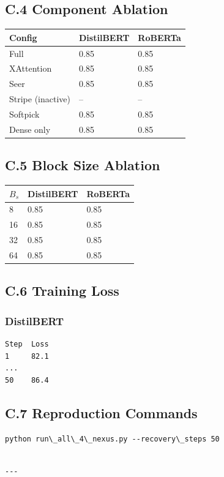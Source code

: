 \subsection{C.4 Component Ablation}

\begin{table}[H]
\centering
\small
\begin{tabular}{lll}
\toprule
\textbf{Config} & \textbf{DistilBERT} & \textbf{RoBERTa} \\
\midrule
Full & 0.85 & 0.85 \\
XAttention & 0.85 & 0.85 \\
Seer & 0.85 & 0.85 \\
Stripe (inactive) & -- & -- \\
Softpick & 0.85 & 0.85 \\
Dense only & 0.85 & 0.85 \\
\bottomrule
\end{tabular}
\end{table}

\subsection{C.5 Block Size Ablation}

\begin{table}[H]
\centering
\small
\begin{tabular}{lll}
\toprule
\textbf{$B_s$} & \textbf{DistilBERT} & \textbf{RoBERTa} \\
\midrule
8 & 0.85 & 0.85 \\
16 & 0.85 & 0.85 \\
32 & 0.85 & 0.85 \\
64 & 0.85 & 0.85 \\
\bottomrule
\end{tabular}
\end{table}

\subsection{C.6 Training Loss}

\subsubsection{DistilBERT}
\begin{lstlisting}
Step  Loss
1     82.1
...
50    86.4
\end{lstlisting}

\subsection{C.7 Reproduction Commands}

\begin{lstlisting}
python run\_all\_4\_nexus.py --recovery\_steps 50
\end{lstlisting}
\begin{lstlisting}

---
\end{lstlisting}